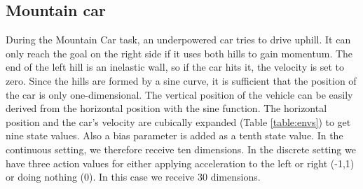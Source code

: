 \subsection{Mountain car}


During the Mountain Car task, an underpowered car tries to drive uphill. It can only reach the goal on the right side if it uses both hills to gain momentum. The end of the left hill is an inelastic wall, so if the car hits it, the velocity is set to zero. Since the hills are formed by a sine curve, it is sufficient that the position of the car is only one-dimensional. The vertical position of the vehicle can be easily derived from the horizontal position with the sine function. The horizontal position and the car's velocity are cubically expanded (Table \ref{table:envs}) to get nine state values. Also a bias parameter is added as a tenth state value. In the continuous setting, we therefore receive ten dimensions. In the discrete setting we have three action values for either applying acceleration to the left or right (-1,1) or doing nothing (0). In this case we receive 30 dimensions.



%
%
